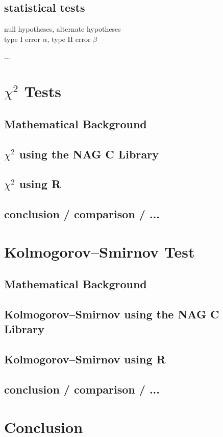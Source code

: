 \documentclass{article}
\begin{document}
\subsection{statistical tests}
	null hypotheses, alternate hypotheses \\
	type I error $\alpha$, type II error $\beta$


...

\section{$\chi^2$ Tests}
\subsection{Mathematical Background}
\subsection{$\chi^2$ using the NAG C Library}
\subsection{$\chi^2$ using R}
\subsection{conclusion / comparison / ...}

\section{Kolmogorov–Smirnov Test}
\subsection{Mathematical Background}
\subsection{Kolmogorov–Smirnov using the NAG C Library}
\subsection{Kolmogorov–Smirnov using R}
\subsection{conclusion / comparison / ...}

\section{Conclusion}
\end{document}

